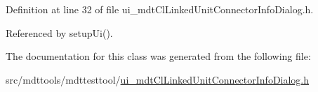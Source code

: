 Definition at line 32 of file ui\-\_\-mdt\-Cl\-Linked\-Unit\-Connector\-Info\-Dialog.\-h.



Referenced by setup\-Ui().



The documentation for this class was generated from the following file\-:\begin{DoxyCompactItemize}
\item 
src/mdttools/mdttesttool/\hyperlink{ui__mdt_cl_linked_unit_connector_info_dialog_8h}{ui\-\_\-mdt\-Cl\-Linked\-Unit\-Connector\-Info\-Dialog.\-h}\end{DoxyCompactItemize}
